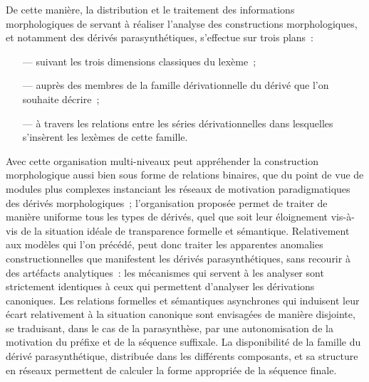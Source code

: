 \documentclass[output=paper]{langsci/langscibook}
\begin{document}
De cette manière, la distribution et le traitement des informations morphologiques de  \paradis{} servant à réaliser l'analyse des constructions morphologiques, et notamment des dérivés parasynthétiques, s'effectue sur trois plans~:
%
\begin{itemize}
\item[---] suivant les trois dimensions classiques du lexème~;
\item[---] auprès des membres de la famille dérivationnelle du dérivé que l'on souhaite décrire~;
\item[---] à travers les relations entre les séries dérivationnelles dans lesquelles s'insèrent les lexèmes de cette famille.
\end{itemize}

Avec cette organisation multi-niveaux \paradis{} peut appréhender la construction morphologique aussi bien sous forme de relations binaires, que du point de vue de modules plus complexes instanciant les réseaux de motivation paradigmatiques des dérivés morphologiques~; l'organisation proposée permet de traiter de manière uniforme tous les types de dérivés, quel que soit leur éloignement vis-à-vis de la situation idéale de transparence formelle et sémantique.  Relativement aux modèles qui l'on précédé, \paradis{} peut donc traiter les apparentes anomalies constructionnelles que manifestent les dérivés parasynthétiques, sans recourir à des artéfacts analytiques~: les mécanismes qui servent à les analyser sont strictement identiques à ceux qui permettent d'analyser les dérivations canoniques.  Les relations formelles et sémantiques asynchrones qui induisent leur écart relativement à la situation canonique sont envisagées de manière disjointe, se traduisant, dans le cas de la parasynthèse, par une autonomisation de la motivation du préfixe et de la séquence suffixale.  La disponibilité de la famille du dérivé parasynthétique, distribuée dans les différents composants, et sa structure en réseaux permettent de calculer la forme appropriée de la séquence finale.


{\sloppy
    \printbibliography[heading=subbibliography,notkeyword=this]
}
\end{document}
